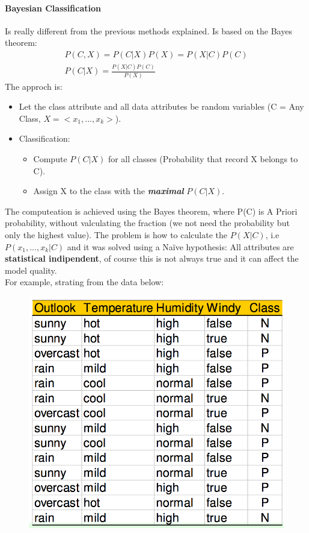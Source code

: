 \documentclass[12pt]{article}
\begin{document}
\paragraph{Bayesian Classification} Is really different from the previous methods explained. Is based on the Bayes theorem:
\begin{equation}
  \begin{gathered}
    P(C,X) = P(C|X)P(X) = P(X|C)P(C)\\
    P(C|X) = \frac{P(X|C)P(C)}{P(X)}
  \end{gathered}
\end{equation}
The approch is:
\begin{itemize}
  \item Let the class attribute and all data attributes be random variables (C = Any Class, $X = <x_1,...,x_k>$).
  \item Classification:
  \begin{itemize}
    \item Compute $P(C|X)$ for all classes (Probability that record X belongs to C).
    \item Assign X to the class with the \textit{\textbf{maximal}} $P(C|X)$.
  \end{itemize}
\end{itemize}
The computeation is achieved using the Bayes theorem, where P(C) is A Priori probability, without valculating the fraction (we not need the probability but only the highest value). The problem is how to calculate the $P(X|C)$, i.e $P(x_1,...,x_k|C)$ and it was solved using a Naïve hypothesis: All attributes are \textbf{statistical indipendent}, of course this is not always true and it can affect the model quality.\\
For example, strating from the data below:
\begin{figure}[H]
  \centering
  \includegraphics[width=0.8\linewidth]{images/bay_data.png}
  \label{fig:bay_data}
\end{figure}
\end{document}
